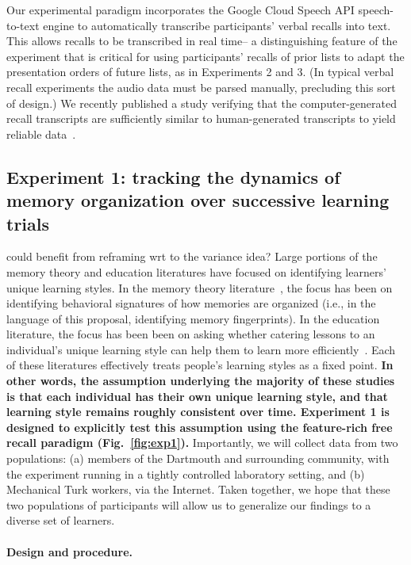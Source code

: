 Our experimental paradigm incorporates the Google Cloud Speech API
speech-to-text engine to automatically transcribe participants' verbal recalls
into text. This allows recalls to be transcribed in real time-- a
distinguishing feature of the experiment that is critical for using
participants' recalls of prior lists to adapt the presentation orders of future
lists, as in Experiments 2 and 3. (In typical verbal recall experiments the
audio data must be parsed manually, precluding this sort of design.) We
recently published a study verifying that the computer-generated recall
transcripts are sufficiently similar to human-generated transcripts to yield
reliable data~\citep{ZimaEtal18}. \subsection*{Experiment 1: tracking the
dynamics of memory organization over successive learning trials} %
could benefit from reframing wrt to the variance idea? Large portions of the
memory theory and education literatures have focused on identifying learners'
unique learning styles. In the memory theory literature~\citep{SmitVela01,
Kaha12, HealKaha14a, MannEtal15}, the focus has been on identifying behavioral
signatures of how memories are organized (i.e., in the language of this
proposal, identifying memory fingerprints). In the education literature, the
focus has been been on asking whether catering lessons to an individual's
unique learning style can help them to learn more
efficiently~\citep{PashEtal08}. Each of these literatures effectively treats
people's learning styles as a fixed point. \textbf{In other words, the
assumption underlying the majority of these studies is that each individual has
their own unique learning style, and that learning style remains roughly
consistent over time. Experiment 1 is designed to explicitly test this
assumption using the feature-rich free recall paradigm (Fig.~\ref{fig:exp1}).}
Importantly, we will collect data from two populations: (a) members of the
Dartmouth and surrounding community, with the experiment running in a tightly
controlled laboratory setting, and (b) Mechanical Turk workers, via the
Internet. Taken together, we hope that these two populations of participants
will allow us to generalize our findings to a diverse set of learners.

\paragraph{Design and procedure.}


